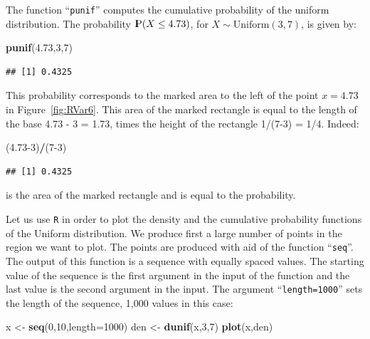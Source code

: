 \documentclass[]{krantz}
\makeatletter
\newenvironment{Shaded}{\begin{snugshade}}{\end{snugshade}}
\newcommand{\DataTypeTok}[1]{\textcolor[rgb]{0.13,0.29,0.53}{#1}}
\newcommand{\DecValTok}[1]{\textcolor[rgb]{0.00,0.00,0.81}{#1}}
\newcommand{\FloatTok}[1]{\textcolor[rgb]{0.00,0.00,0.81}{#1}}
\newcommand{\KeywordTok}[1]{\textcolor[rgb]{0.13,0.29,0.53}{\textbf{#1}}}
\newcommand{\NormalTok}[1]{#1}
\newcommand{\OperatorTok}[1]{\textcolor[rgb]{0.81,0.36,0.00}{\textbf{#1}}}
\newcommand{\StringTok}[1]{\textcolor[rgb]{0.31,0.60,0.02}{#1}}
\newcommand{\Prob}{{\rm I\kern-.3em P}}
\newenvironment{kframe}{%
\medskip{}
\setlength{\fboxsep}{.8em}
 \def\at@end@of@kframe{}%
 \ifinner\ifhmode%
  \def\at@end@of@kframe{\end{minipage}}%
  \begin{minipage}{\columnwidth}%
 \fi\fi%
 \def\FrameCommand##1{\hskip\@totalleftmargin \hskip-\fboxsep
 \colorbox{shadecolor}{##1}\hskip-\fboxsep
     \hskip-\linewidth \hskip-\@totalleftmargin \hskip\columnwidth}%
 \MakeFramed {\advance\hsize-\width
   \@totalleftmargin\z@ \linewidth\hsize
   \@setminipage}}%
 {\par\unskip\endMakeFramed%
 \at@end@of@kframe}
\renewenvironment{Shaded}{\begin{kframe}}{\end{kframe}}
\theoremstyle{definition}
\theoremstyle{definition}
\theoremstyle{definition}
\theoremstyle{remark}
\makeatother
\begin{document}
The function ``\texttt{punif}'' computes the cumulative probability of the
uniform distribution. The probability \(\Prob(X \leq 4.73)\), for
\(X \sim \mathrm{Uniform}(3,7)\), is given by:

\begin{Shaded}
\begin{Highlighting}[]
\KeywordTok{punif}\NormalTok{(}\FloatTok{4.73}\NormalTok{,}\DecValTok{3}\NormalTok{,}\DecValTok{7}\NormalTok{)}
\end{Highlighting}
\end{Shaded}

\begin{verbatim}
## [1] 0.4325
\end{verbatim}

This probability corresponds to the marked area to the left of the point
\(x = 4.73\) in Figure~\ref{fig:RVar6}. This area of the marked
rectangle is equal to the length of the base 4.73 - 3 = 1.73, times the
height of the rectangle 1/(7-3) = 1/4. Indeed:

\begin{Shaded}
\begin{Highlighting}[]
\NormalTok{(}\FloatTok{4.73}\DecValTok{-3}\NormalTok{)}\OperatorTok{/}\NormalTok{(}\DecValTok{7-3}\NormalTok{)}
\end{Highlighting}
\end{Shaded}

\begin{verbatim}
## [1] 0.4325
\end{verbatim}

is the area of the marked rectangle and is equal to the probability.

Let us use \texttt{R} in order to plot the density and the cumulative
probability functions of the Uniform distribution. We produce first a
large number of points in the region we want to plot. The points are
produced with aid of the function ``\texttt{seq}''. The output of this function
is a sequence with equally spaced values. The starting value of the
sequence is the first argument in the input of the function and the last
value is the second argument in the input. The argument ``\texttt{length=1000}''
sets the length of the sequence, 1,000 values in this case:

\begin{Shaded}
\begin{Highlighting}[]
\NormalTok{x <-}\StringTok{ }\KeywordTok{seq}\NormalTok{(}\DecValTok{0}\NormalTok{,}\DecValTok{10}\NormalTok{,}\DataTypeTok{length=}\DecValTok{1000}\NormalTok{)}
\NormalTok{den <-}\StringTok{ }\KeywordTok{dunif}\NormalTok{(x,}\DecValTok{3}\NormalTok{,}\DecValTok{7}\NormalTok{)}
\KeywordTok{plot}\NormalTok{(x,den)}
\end{Highlighting}
\end{Shaded}
\end{document}
